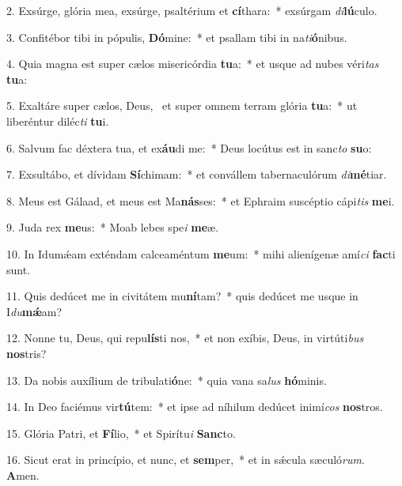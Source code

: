 2. Exsúrge, glória mea, exsúrge, psaltérium et \textbf{cí}thara:~*  exsúrgam \textit{di}\textbf{lú}culo.\

3. Confitébor tibi in pópulis, \textbf{Dó}mine:~*  et psallam tibi in na\textit{ti}\textbf{ó}nibus.\

4. Quia magna est super cælos misericórdia \textbf{tu}a:~*  et usque ad nubes véri\textit{tas} \textbf{tu}a:\

5. Exaltáre super cælos, Deus, \dag\  et super omnem terram glória \textbf{tu}a:~*  ut liberéntur diléc\textit{ti} \textbf{tu}i.\

6. Salvum fac déxtera tua, et ex\textbf{áu}di me:~*  Deus locútus est in sanc\textit{to} \textbf{su}o:\

7. Exsultábo, et dívidam \textbf{Sí}chimam:~*  et convállem tabernaculórum \textit{di}\textbf{mé}tiar.\

8. Meus est Gálaad, et meus est Ma\textbf{nás}ses:~*  et Ephraim suscéptio cápi\textit{tis} \textbf{me}i.\

9. Juda rex \textbf{me}us:~*  Moab lebes spe\textit{i} \textbf{me}æ.\

10. In Idumǽam exténdam calceaméntum \textbf{me}um:~*  mihi alienígenæ amí\textit{ci} \textbf{fac}ti sunt.\

11. Quis dedúcet me in civitátem mu\textbf{ní}tam?~*  quis dedúcet me usque in I\textit{du}\textbf{mǽ}am?\

12. Nonne tu, Deus, qui repu\textbf{lís}ti nos,~*  et non exíbis, Deus, in virtúti\textit{bus} \textbf{nos}tris?\

13. Da nobis auxílium de tribulati\textbf{ó}ne:~*  quia vana sa\textit{lus} \textbf{hó}minis.\

14. In Deo faciémus vir\textbf{tú}tem:~*  et ipse ad níhilum dedúcet inimí\textit{cos} \textbf{nos}tros.\

15. Glória Patri, et \textbf{Fí}lio,~*  et Spirítu\textit{i} \textbf{Sanc}to.\

16. Sicut erat in princípio, et nunc, et \textbf{sem}per,~*  et in sǽcula sæculó\textit{rum}. \textbf{A}men.\

